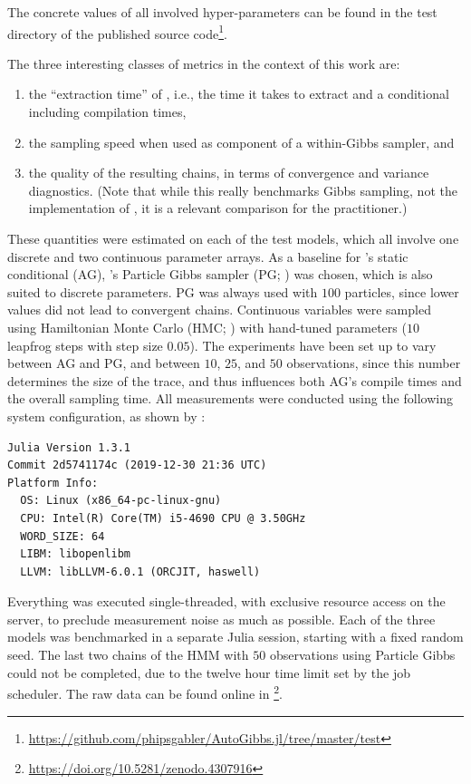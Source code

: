 The concrete values of all involved hyper-parameters can be found in the test directory of the
published source
code\footnote{\protect\href{https://github.com/phipsgabler/AutoGibbs.jl/tree/2b433f8f5c37a55f63fbf175193130b46c8b569f/test}{https://github.com/phipsgabler/AutoGibbs.jl/tree/master/test}}.

The three interesting classes of metrics in the context of this work are:
\begin{enumerate}
  \firmlist
\item the \enquote{extraction time} of \autogibbsjl{}, i.e., the time it takes to extract and a
  conditional including compilation times,
\item the sampling speed when used as component of a within-Gibbs sampler, and
\item the quality of the resulting chains, in terms of convergence and variance diagnostics.  (Note
  that while this really benchmarks Gibbs sampling, not the implementation of \autogibbsjl{}, it is
  a relevant comparison for the practitioner.)
\end{enumerate}
These quantities were estimated on each of the test models, which all involve one discrete and two
continuous parameter arrays.  As a baseline for \autogibbsjl{}'s static conditional (AG),
\turingjl{}'s Particle Gibbs sampler (PG; \textcite[see]{andrieu2010particlea}) was chosen, which is
also suited to discrete parameters.  PG was always used with \(100\) particles, since lower values
did not lead to convergent chains.  Continuous variables were sampled using Hamiltonian Monte Carlo
(HMC; \textcite[see]{betancourt2018conceptual}) with hand-tuned parameters (\(10\) leapfrog steps
with step size \(0.05\)).  The experiments have been set up to vary between AG and PG, and between
\(10\), \(25\), and \(50\) observations, since this number determines the size of the trace, and
thus influences both AG's compile times and the overall sampling time.  All measurements were
conducted using the following system configuration, as shown by
:
\begin{lstlisting}
Julia Version 1.3.1
Commit 2d5741174c (2019-12-30 21:36 UTC)
Platform Info:
  OS: Linux (x86_64-pc-linux-gnu)
  CPU: Intel(R) Core(TM) i5-4690 CPU @ 3.50GHz
  WORD_SIZE: 64
  LIBM: libopenlibm
  LLVM: libLLVM-6.0.1 (ORCJIT, haswell)
\end{lstlisting}
Everything was executed single-threaded, with exclusive resource access on the server, to preclude
measurement noise as much as possible.  Each of the three models was benchmarked in a separate Julia
session, starting with a fixed random seed.  The last two chains of the HMM with \(50\) observations
using Particle Gibbs could not be completed, due to the twelve hour time limit set by the job
scheduler.  The raw data can be found online in
\textcite{gabler2020mcmc}\footnote{\protect\url{https://doi.org/10.5281/zenodo.4307916}}.

